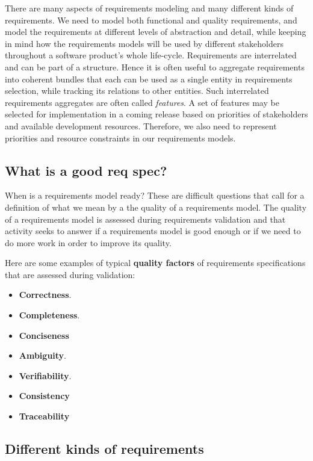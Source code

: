 There are many aspects of requirements modeling and many different kinds of requirements. We need to model both functional and quality requirements, and model the requirements at different levels of abstraction and detail, while keeping in mind how the requirements models will be used by different stakeholders throughout a software product's whole life-cycle. Requirements are interrelated and can be part of a structure. Hence it is often useful to aggregate requirements into coherent bundles that each can be used as a single entity in requirements selection, while tracking its relations to other entities. Such interrelated requirements aggregates are often called \emph{features}. A set of features may be selected for implementation in a coming release based on priorities of stakeholders and available development resources. Therefore, we also need to represent priorities and resource constraints in our requirements models.


\subsection{What is a good req spec?}

 When is a requirements model ready? These are difficult questions that call for a definition of what we mean by a the quality of a requirements model. The quality of a requirements model is assessed during requirements validation and that activity seeks to answer if a requirements model is good enough or if we need to do more work in order to improve its quality.

Here are some examples of typical \textbf{quality factors} of requirements specifications that are assessed during validation:
\begin{itemize}
  \item \textbf{Correctness}. 
  \item \textbf{Completeness}.
  \item \textbf{Conciseness}
  \item \textbf{Ambiguity}.
  \item \textbf{Verifiability}.
  \item \textbf{Consistency}
  \item \textbf{Traceability}
\end{itemize}



\subsection{Different kinds of requirements}

